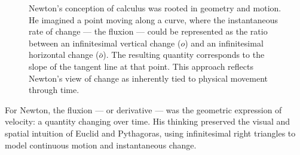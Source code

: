 \begin{figure}[H]
\centering
{}

\vspace{0.5em}
\caption{\small Newton's conception of calculus was rooted in geometry and motion. He imagined a point moving along a curve, where the instantaneous rate of change — the fluxion — could be represented as the ratio between an infinitesimal vertical change ($o$) and an infinitesimal horizontal change ($\bar{o}$). The resulting quantity corresponds to the slope of the tangent line at that point. This approach reflects Newton’s view of change as inherently tied to physical movement through time.}
\end{figure}


For Newton, the fluxion — or derivative — was the geometric expression of velocity: a quantity changing over time. His thinking preserved the visual and spatial intuition of Euclid and Pythagoras, using infinitesimal right triangles to model continuous motion and instantaneous change.

